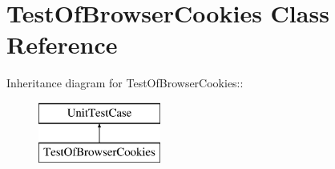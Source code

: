 \hypertarget{class_test_of_browser_cookies}{
\section{TestOfBrowserCookies Class Reference}
\label{class_test_of_browser_cookies}
}
Inheritance diagram for TestOfBrowserCookies::\begin{figure}[H]
\begin{center}
\leavevmode
\includegraphics[height=2cm]{class_test_of_browser_cookies}
\end{center}
\end{figure}
